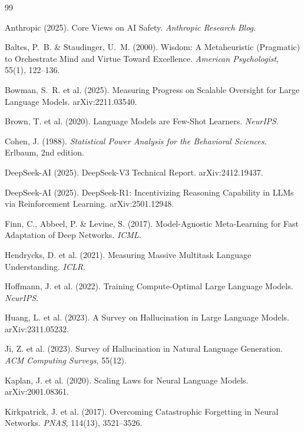 \documentclass{article}
\begin{document}
\begin{thebibliography}{99}

Anthropic (2025).
Core Views on AI Safety.
\textit{Anthropic Research Blog}.

Baltes, P.~B. \& Staudinger, U.~M. (2000).
Wisdom: A Metaheuristic (Pragmatic) to Orchestrate Mind and Virtue
Toward Excellence.
\textit{American Psychologist}, 55(1), 122--136.

Bowman, S.~R. et al. (2025).
Measuring Progress on Scalable Oversight for Large Language Models.
arXiv:2211.03540.

Brown, T. et al. (2020).
Language Models are Few-Shot Learners.
\textit{NeurIPS}.

Cohen, J. (1988).
\textit{Statistical Power Analysis for the Behavioral Sciences}.
Erlbaum, 2nd edition.

DeepSeek-AI (2025).
DeepSeek-V3 Technical Report.
arXiv:2412.19437.

DeepSeek-AI (2025).
DeepSeek-R1: Incentivizing Reasoning Capability in LLMs via
Reinforcement Learning.
arXiv:2501.12948.

Finn, C., Abbeel, P. \& Levine, S. (2017).
Model-Agnostic Meta-Learning for Fast Adaptation of Deep Networks.
\textit{ICML}.

Hendrycks, D. et al. (2021).
Measuring Massive Multitask Language Understanding.
\textit{ICLR}.

Hoffmann, J. et al. (2022).
Training Compute-Optimal Large Language Models.
\textit{NeurIPS}.

Huang, L. et al. (2023).
A Survey on Hallucination in Large Language Models.
arXiv:2311.05232.

Ji, Z. et al. (2023).
Survey of Hallucination in Natural Language Generation.
\textit{ACM Computing Surveys}, 55(12).

Kaplan, J. et al. (2020).
Scaling Laws for Neural Language Models.
arXiv:2001.08361.

Kirkpatrick, J. et al. (2017).
Overcoming Catastrophic Forgetting in Neural Networks.
\textit{PNAS}, 114(13), 3521--3526.


\end{thebibliography}
\end{document}
